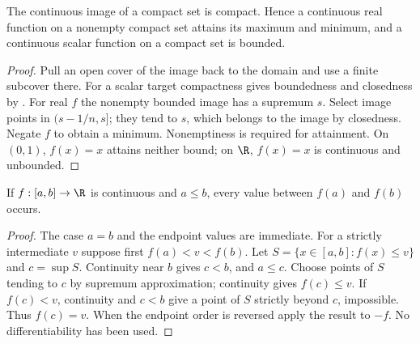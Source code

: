 \begin{theorem}
The continuous image of a compact set is compact. Hence a continuous real function on a nonempty compact set attains its maximum and minimum, and a continuous scalar function on a compact set is bounded.
\end{theorem}
\begin{proof}
Pull an open cover of the image back to the domain and use a finite subcover there. For a scalar target compactness gives boundedness and closedness by . For real $f$ the nonempty bounded image has a supremum $s$. Select image points in $(s-1/n,s]$; they tend to $s$, which belongs to the image by closedness. Negate $f$ to obtain a minimum. Nonemptiness is required for attainment. On $(0,1)$, $f(x)=x$ attains neither bound; on $\R$, $f(x)=x$ is continuous and unbounded.
\end{proof}

\begin{theorem}
If $f:[a,b]\to\R$ is continuous and $a\le b$, every value between $f(a)$ and $f(b)$ occurs.
\end{theorem}
\begin{proof}
The case $a=b$ and the endpoint values are immediate. For a strictly intermediate $v$ suppose first $f(a)<v<f(b)$. Let $S=\{x\in[a,b]:f(x)\le v\}$ and $c=\sup S$. Continuity near $b$ gives $c<b$, and $a\le c$. Choose points of $S$ tending to $c$ by supremum approximation; continuity gives $f(c)\le v$. If $f(c)<v$, continuity and $c<b$ give a point of $S$ strictly beyond $c$, impossible. Thus $f(c)=v$. When the endpoint order is reversed apply the result to $-f$. No differentiability has been used.
\end{proof}

